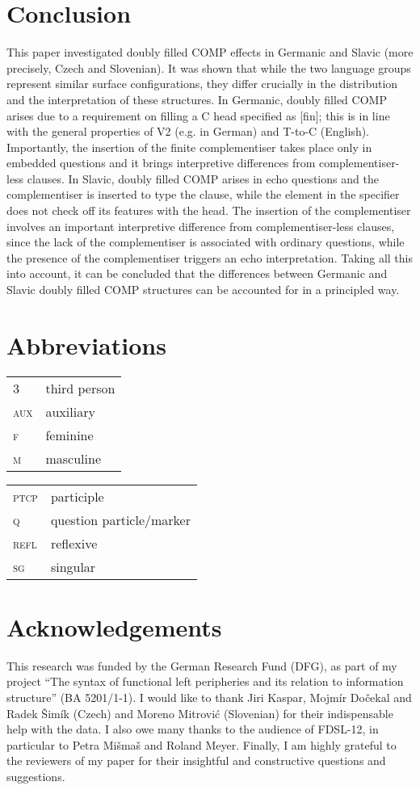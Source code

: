 \documentclass[output=paper,
modfonts, hidelinks, newtxmath
]{langscibook}
\begin{document}
\section{Conclusion}
This paper investigated doubly filled COMP effects in Germanic and Slavic (more precisely, Czech and Slovenian). It was shown that while the two language groups represent similar surface configurations, they differ crucially in the distribution and the interpretation of these structures. In Germanic, doubly filled COMP arises due to a requirement on filling a C head specified as [fin]; this is in line with the general properties of V2 (e.g. in German) and T-to-C (English). Importantly, the insertion of the finite complementiser takes place only in embedded questions and it brings interpretive differences from complementiser-less clauses. In Slavic, doubly filled COMP arises in echo questions and the complementiser is inserted to type the clause, while the element in the specifier does not check off its features with the head. The insertion of the complementiser involves an important interpretive difference from complementiser-less clauses, since the lack of the complementiser is associated with ordinary questions, while the presence of the complementiser triggers an echo interpretation. Taking all this into account, it can be concluded that the differences between Germanic and Slavic doubly filled COMP structures can be accounted for in a principled way.

\section*{Abbreviations}

\begin{tabularx}{.5\textwidth}{@{}lQ@{}}
3&third person\\
\textsc{aux}&auxiliary\\
\textsc{f}&feminine\\
\textsc{m}&masculine\\
\end{tabularx}%
\begin{tabularx}{.5\textwidth}{@{}lQ@{}}
\textsc{ptcp}&participle\\
\textsc{q}&question particle/marker\\
\textsc{refl}&reflexive\\
\textsc{sg}&singular\\
\end{tabularx}

\section*{Acknowledgements}
This research was funded by the German Research Fund (DFG), as part of my project ``The syntax of functional left peripheries and its relation to information structure'' (BA 5201/1-1). I would like to thank Jiri Kaspar,  Mojmír Dočekal and Radek Šimík (Czech) and Moreno Mitrović (Slovenian) for their indispensable help with the data. I also owe many thanks to the audience of FDSL-12, in particular to Petra Mišmaš and Roland Meyer. Finally, I am highly grateful to the reviewers of my paper for their insightful and constructive questions and suggestions.

\printbibliography[heading=subbibliography,notkeyword=this]
\end{document}
